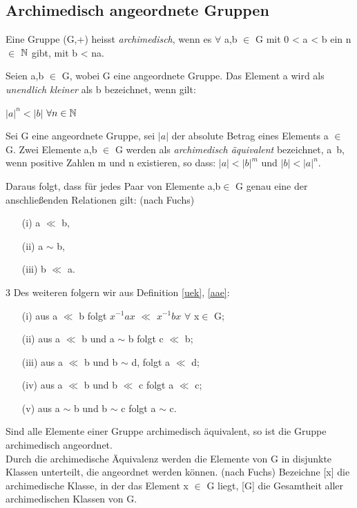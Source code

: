 \subsection{Archimedisch angeordnete Gruppen}
%
%
\begin{defn}\label{archim}
Eine Gruppe (G,+) heisst \textit{archimedisch}, wenn es $\forall$ a,b $\in$ G  mit 0 < a < b ein n $\in$ $\mathbb{N} $ gibt, mit b < na.
\end{defn}
%
%
\begin{defn}\label{uek}
Seien a,b $\in$ G, wobei G eine angeordnete Gruppe. Das Element a wird als \textit{unendlich kleiner} als b bezeichnet, wenn gilt: \\
\centerline{$|a|^n < |b|$  $\forall n \in \mathbb{N} $}
\end{defn}
%
\begin{defn}\label{aae}
Sei G eine angeordnete Gruppe, sei $|a|$ der absolute Betrag eines Elements a $\in$ G. Zwei Elemente a,b $\in$ G werden als \textit{archimedisch äquivalent} bezeichnet, a~b, wenn positive Zahlen m und n existieren, so dass: 
$|a| < |b|^m $ und $|b| < |a|^n$. 
\end{defn}
%
\newpage
Daraus folgt, dass für jedes Paar von Elemente a,b$\in$ G genau eine der anschließenden Relationen gilt: (nach Fuchs)
\begin{multicols}{3}
\begin{enumerate}
\item[(i)] a $\ll$ b, 
\item[(ii)] a $\sim$ b,
\item[(iii)] b $\ll$ a.
\end{enumerate}
\end{multicols}{3}
%
Des weiteren folgern wir aus Definition \ref{uek}, \ref{aae}:
\begin{enumerate}
\item[(i)] aus a $\ll$ b folgt $x^{-1}ax $ $\ll$ $x^{-1}bx$ $\forall$ x$\in$ G;
\item[(ii)] aus a $\ll$ b und a $\sim$ b folgt c $\ll$ b;
\item[(iii)] aus a $\ll$ b und b $\sim$ d, folgt a $\ll$ d;
\item[(iv)] aus a $\ll$ b und b $\ll$ c folgt a $\ll$ c;
\item[(v)] aus a $\sim$ b und b $\sim$ c folgt a $\sim$ c.
\end{enumerate}
Sind alle Elemente einer Gruppe archimedisch äquivalent, so ist die Gruppe archimedisch angeordnet. \\ Durch die archimedische Äquivalenz werden die Elemente von G in disjunkte Klassen unterteilt, die angeordnet werden können. (nach Fuchs) Bezeichne [x] die archimedische Klasse, in der das Element x $\in$ G liegt, [G] die Gesamtheit aller archimedischen Klassen von G. \\
